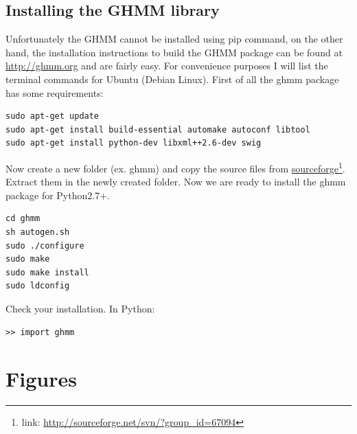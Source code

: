 \documentclass[a4paper,12pt]{article}
\theoremstyle{definition}
\begin{document}
\subsection{Installing the GHMM library}
Unfortunately the GHMM cannot be installed using pip command, on the other hand, the installation instructions to build the GHMM package can be found at \href{http://ghmm.org}{http://ghmm.org} and are fairly easy. For convenience purposes I will list the terminal commands for Ubuntu (Debian Linux). 
First of all the ghmm package has some requirements:
\begin{lstlisting}
sudo apt-get update 
sudo apt-get install build-essential automake autoconf libtool
sudo apt-get install python-dev libxml++2.6-dev swig
\end{lstlisting}

Now create a new folder (ex. ghmm) and copy the source files from \href{http://sourceforge.net/svn/?group\_id=67094}{sourceforge}\footnote{link: \href{http://sourceforge.net/svn/?group\_id=67094}{http://sourceforge.net/svn/?group\_id=67094} }. Extract them in the newly created folder.  
Now we are ready to install the ghmm package for Python2.7+. 
\begin{lstlisting}
cd ghmm
sh autogen.sh
sudo ./configure
sudo make
sudo make install
sudo ldconfig
\end{lstlisting}
Check your installation. In Python:
\begin{lstlisting}
>> import ghmm
\end{lstlisting}


\section{Figures}
\end{document}
